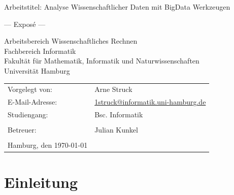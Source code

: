 \documentclass[
	12pt,
	a4paper,
	BCOR10mm,
	DIV14,
	listof=totoc,
	bibliography=totoc,
	headsepline
]{scrreprt}
\begin{document}
\begin{titlepage}
	\begin{center}
		{\titlefont\huge Arbeitstitel: Analyse Wissenschaftlicher Daten mit BigData Werkzeugen \par}

		\bigskip
		\bigskip

		{\titlefont\Large --- Exposé ---\par}

		\bigskip
		\bigskip

		{\large Arbeitsbereich Wissenschaftliches Rechnen\\
		Fachbereich Informatik\\
		Fakultät für Mathematik, Informatik und Naturwissenschaften\\
		Universität Hamburg\par}
	\end{center}

	\vfill

	{\large \begin{tabular}{ll}
		Vorgelegt von: & Arne Struck \\
		E-Mail-Adresse: 
			& \href{mailto:1struck@informatik.uni-hamburg.de}{1struck@informatik.uni-hamburg.de} \\ 
		Studiengang: & Bsc. Informatik \\
		\\
		Betreuer: & Julian Kunkel \\
		\\
		Hamburg, den \today
	\end{tabular}\par}
\end{titlepage}

\thispagestyle{empty}

\newpage\null\thispagestyle{empty}\newpage
\tableofcontents
\newpage\null\thispagestyle{empty}\newpage

\chapter{Einleitung}
\label{einleitung}
\end{document}

